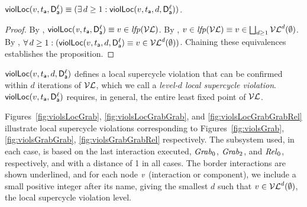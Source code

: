 
\begin{proposition}
\label{prop:locViol-equiv-locViolDist}
$\scVL{v}{t_\act}{\act}{\l} \ev (\ex d \ge 1: \scVLd{v}{d}{t_\act}{\act}{\l})$.
\end{proposition}
%
\begin{proof}
By , $\scVL{\ndv}{t_\act}{\act}{\l} \ev v \in \lfp{\lVFs}$.
By , $v \in \lfp{\lVFs} \ev v \in \JOIN_{d \ge 1} \lVFs^{d} (\ewfg)$.
By , $\fa d \ge 1: (\scVLd{v}{d}{t_\act}{\act}{\l} \ev v \in \lVFs^{d} (\ewfg))$.
Chaining these equivalences establishes the proposition.
\end{proof}
%
$\scVLd{v}{d}{t_\act}{\act}{\l}$ defines a local supercycle violation that can be confirmed within $d$ iterations of $\lVFs$, which we call a
\emph{level-$d$ local supercycle violation}.
$\scVL{v}{t_\act}{\act}{\l}$ requires, in general, the entire least fixed point of $\lVFs$.



\begin{example}
\label{exm:loc-dphils-viols}
Figures~\ref{fig:violsLocGrab}, \ref{fig:violsLocGrabGrab}, and \ref{fig:violsLocGrabGrabRel} illustrate local supercycle violations corresponding to
Figures~\ref{fig:violsGrab}, \ref{fig:violsGrabGrab}, \ref{fig:violsGrabGrabRel} respectively. The subsystem used, in each case, is based on the last interaction
executed, \ie $\Grab_0$, $\Grab_2$, and $\Rel_0$, respectively, and with a distance of 1 in all cases.
The border interactions are shown underlined, and 
for each node $\ndv$ (interaction or component), we include a small positive integer after its name, giving the smallest $d$ such that $v \in \lVFi{\ewfg}{d}$, 
\ie the local supercycle violation level.
\end{example}



